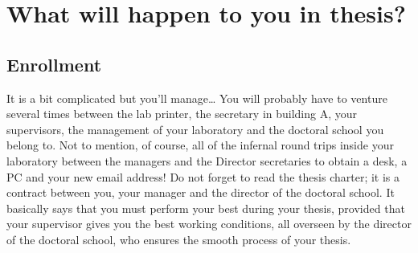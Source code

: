 \chapter{What will happen to you in thesis?}

\section{Enrollment}
It is a bit complicated but you'll manage\dots
You will probably have to venture several times between the lab printer, the secretary in building A, your supervisors, the management of your laboratory and the doctoral school you belong to.
Not to mention, of course, all of the infernal round trips inside your laboratory between the managers and the Director secretaries to obtain a desk, a PC and your new email address!
Do not forget to read the thesis charter; it is a contract between you, your manager and the director of the doctoral school.
It basically says that you must perform your best during your thesis, provided that your supervisor gives you the best working conditions, all overseen by the director of the doctoral school, who ensures the smooth process of your thesis.
